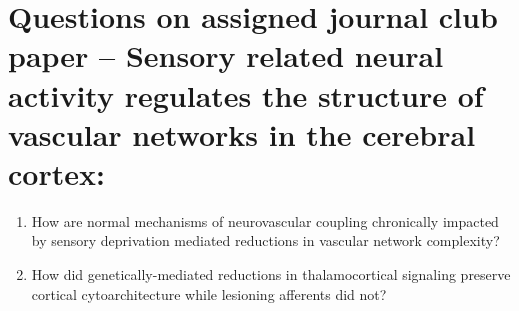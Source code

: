 \documentclass[12pt, letterpaper]{article}
\begin{document}
\section*{\normalfont\normalsize\bf Questions on assigned journal club paper --  Sensory related neural activity regulates the structure of vascular networks in the cerebral cortex:}
\begin{enumerate}
    \item How are normal mechanisms of neurovascular coupling chronically impacted by sensory deprivation mediated reductions in vascular network complexity?
    \item How did genetically-mediated reductions in thalamocortical signaling preserve cortical cytoarchitecture while lesioning afferents did not?
\end{enumerate}
\end{document}
